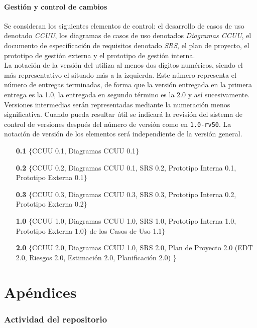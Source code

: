 \documentclass[11pt, a4paper, twoside, titlepage]{article}
\begin{document}
		\subsection{Gestión y control de cambios}
			Se consideran los siguientes elementos de control: el desarrollo de casos de uso denotado \textit{CCUU}, los diagramas de casos de uso denotados \textit{Diagramas CCUU}, el documento de especificación de requisitos \software denotado \textit{SRS}, el plan de proyecto, el prototipo de gestión externa y el prototipo de gestión interna.\\

			La notación de la versión del \software utiliza al menos dos dígitos numéricos, siendo el más representativo el situado más a la izquierda. Este número representa el número de entregas terminadas, de forma que la versión entregada en la primera entrega es la 1.0, la entregada en segundo término es la 2.0 y así sucesivamente. Versiones intermedias serán representadas mediante la numeración menos significativa. Cuando pueda resultar útil se indicará la revisión del sistema de control de versiones después del número de versión como en \verb|1.0-rv50|. La notación de versión de los elementos será independiente de la versión general.
		
		\begin{itemize}
			\item[\bfseries 0.1] $\{$CCUU 0.1, Diagramas CCUU 0.1$\}$
			\item[\bfseries 0.2] $\{$CCUU 0.2, Diagramas CCUU 0.1, SRS 0.2, Prototipo Interna 0.1, Prototipo Externa 0.1$\}$
			\item[\bfseries 0.3] $\{$CCUU 0.3, Diagramas CCUU 0.3, SRS 0.3, Prototipo Interna 0.2, Prototipo Externa 0.2$\}$
			\item[\bfseries 1.0] $\{$CCUU 1.0, Diagramas CCUU 1.0, SRS 1.0, Prototipo Interna 1.0, Prototipo Externa 1.0$\}$ de los Casos de Uso 1.1$\}$
			\item[\bfseries 2.0] $\{$CCUU 2.0, Diagramas CCUU 1.0, SRS 2.0, Plan de Proyecto 2.0 (EDT 2.0, Riesgos 2.0, Estimación 2.0, Planificación 2.0) $\}$
		\end{itemize}
		
	\newpage
	\part*{Apéndices}
		\appendix
		\section{Actividad del repositorio}
			
		
		\newpage
		\normalsize
		\nocite{PSMAN}
		
		
\end{document}
